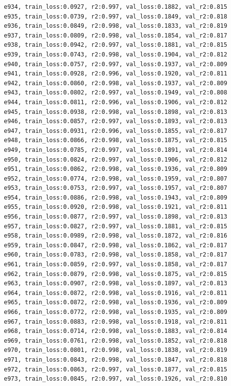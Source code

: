 \documentclass[a4paper, 12pt]{article}
\begin{document}
\begin{lstlisting}
e934, train_loss:0.0927, r2:0.997, val_loss:0.1882, val_r2:0.815
e935, train_loss:0.0739, r2:0.997, val_loss:0.1849, val_r2:0.818
e936, train_loss:0.0849, r2:0.998, val_loss:0.1833, val_r2:0.819
e937, train_loss:0.0809, r2:0.998, val_loss:0.1854, val_r2:0.817
e938, train_loss:0.0942, r2:0.997, val_loss:0.1881, val_r2:0.815
e939, train_loss:0.0743, r2:0.998, val_loss:0.1904, val_r2:0.812
e940, train_loss:0.0757, r2:0.997, val_loss:0.1937, val_r2:0.809
e941, train_loss:0.0928, r2:0.996, val_loss:0.1920, val_r2:0.811
e942, train_loss:0.0860, r2:0.998, val_loss:0.1937, val_r2:0.809
e943, train_loss:0.0802, r2:0.997, val_loss:0.1949, val_r2:0.808
e944, train_loss:0.0811, r2:0.996, val_loss:0.1906, val_r2:0.812
e945, train_loss:0.0938, r2:0.998, val_loss:0.1898, val_r2:0.813
e946, train_loss:0.0857, r2:0.997, val_loss:0.1893, val_r2:0.813
e947, train_loss:0.0931, r2:0.996, val_loss:0.1855, val_r2:0.817
e948, train_loss:0.0866, r2:0.998, val_loss:0.1875, val_r2:0.815
e949, train_loss:0.0785, r2:0.997, val_loss:0.1891, val_r2:0.814
e950, train_loss:0.0824, r2:0.997, val_loss:0.1906, val_r2:0.812
e951, train_loss:0.0862, r2:0.998, val_loss:0.1936, val_r2:0.809
e952, train_loss:0.0774, r2:0.998, val_loss:0.1959, val_r2:0.807
e953, train_loss:0.0753, r2:0.997, val_loss:0.1957, val_r2:0.807
e954, train_loss:0.0886, r2:0.998, val_loss:0.1943, val_r2:0.809
e955, train_loss:0.0920, r2:0.998, val_loss:0.1921, val_r2:0.811
e956, train_loss:0.0877, r2:0.997, val_loss:0.1898, val_r2:0.813
e957, train_loss:0.0827, r2:0.997, val_loss:0.1881, val_r2:0.815
e958, train_loss:0.0989, r2:0.998, val_loss:0.1872, val_r2:0.816
e959, train_loss:0.0847, r2:0.998, val_loss:0.1862, val_r2:0.817
e960, train_loss:0.0783, r2:0.998, val_loss:0.1858, val_r2:0.817
e961, train_loss:0.0859, r2:0.997, val_loss:0.1858, val_r2:0.817
e962, train_loss:0.0879, r2:0.998, val_loss:0.1875, val_r2:0.815
e963, train_loss:0.0907, r2:0.998, val_loss:0.1897, val_r2:0.813
e964, train_loss:0.0872, r2:0.998, val_loss:0.1916, val_r2:0.811
e965, train_loss:0.0872, r2:0.998, val_loss:0.1936, val_r2:0.809
e966, train_loss:0.0772, r2:0.998, val_loss:0.1935, val_r2:0.809
e967, train_loss:0.0883, r2:0.998, val_loss:0.1918, val_r2:0.811
e968, train_loss:0.0714, r2:0.998, val_loss:0.1883, val_r2:0.814
e969, train_loss:0.0761, r2:0.998, val_loss:0.1852, val_r2:0.818
e970, train_loss:0.0801, r2:0.998, val_loss:0.1838, val_r2:0.819
e971, train_loss:0.0843, r2:0.998, val_loss:0.1847, val_r2:0.818
e972, train_loss:0.0863, r2:0.997, val_loss:0.1877, val_r2:0.815
e973, train_loss:0.0845, r2:0.997, val_loss:0.1926, val_r2:0.810

\end{lstlisting}
\end{document}

